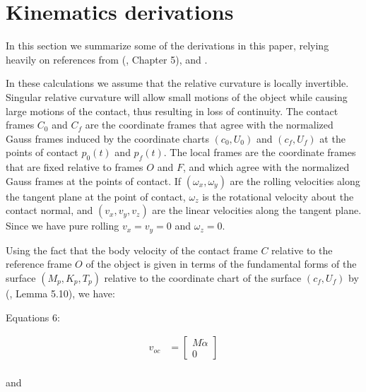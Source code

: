 \documentclass[journal]{IEEEtran}
\begin{document}
\appendices
\section{Kinematics derivations}
In this section we summarize some of the derivations in this paper, relying heavily on references from (\cite{book}, Chapter 5), and \cite{DJMontana}. 

In these calculations we assume that the relative curvature is locally invertible.  Singular relative curvature will allow small motions of the object while causing large motions of the contact, thus resulting in loss of continuity.  The contact frames $ C_0 $ and $ C_f $ are the coordinate frames that agree with the normalized Gauss frames induced by the coordinate charts $ (c_0, U_0) $ and $ (c_f, U_f) $ at the points of contact $ p_0 (t) $ and $ p_f(t) $. The local frames are the coordinate frames that are fixed relative to frames $ O $ and $ F $, and which agree with the normalized Gauss frames at the points of contact. If $ (\omega_x, \omega_y) $ are the rolling velocities along the tangent plane at the point of contact, $ \omega_z $ is the rotational velocity about the contact normal, and $ (v_x, v_y,v_z) $ are the linear velocities along the tangent plane. Since we have pure rolling $ v_x = v_y = 0 $ and $ \omega_z =0 $. 

Using the fact that the body velocity of the contact frame $C $ relative to the reference frame $ O $ of the object is given in terms of the fundamental forms of the surface $ (M_p, K_p, T_p ) $ relative to the coordinate chart of the surface $ (c_f, U_f) $ by (\cite{book}, Lemma 5.10), we have:
\begin{center}
Equations 6:
\end{center}

\begin{align*}
v_{oc} &= \begin{bmatrix}
	   M\dot{\alpha} \\
	   0
	 \end{bmatrix} \\
\end{align*}
\begin{center}
and
\end{center}
\end{document}
